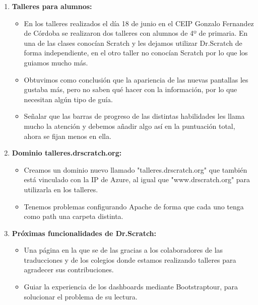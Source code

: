 \documentclass[a4paper,12pt]{letter}
\begin{document}
\begin{letter}
\begin{enumerate}
    
    \item{\textbf {Talleres para alumnos:}}
    \begin{itemize}
            \item {En los talleres realizados el día 18 de junio en el CEIP
                    Gonzalo Fernandez de Córdoba se realizaron dos talleres con
                    alumnos de 4º de primaria. En una de las clases conocían 
                    Scratch y les dejamos utilizar Dr.Scratch de forma independiente,
                    en el otro taller no conocían Scratch por lo que los guiamos
                    mucho más.}
            \item {Obtuvimos como conclusión que la apariencia de las nuevas
                    pantallas les gustaba más, pero no saben qué hacer
                    con la información, por lo que necesitan algún tipo de guía.}
            \item {Señalar que las barras de progreso de las distintas habilidades
                    les llama mucho la atención y debemos añadir algo así en la
                    puntuación total, ahora se fijan menos en ella.}
    \end{itemize}
    
    \item{\textbf {Dominio talleres.drscratch.org:}}
    \begin{itemize}
            \item {Creamos un dominio nuevo llamado "talleres.drscratch.org" que
                    también está vinculado con la IP de Azure, al igual que 
                    "www.drscratch.org" para utilizarla en los talleres.}
            \item {Tenemos problemas configurando Apache de forma que cada uno
                    tenga como path una carpeta distinta.}
    \end{itemize}

    \item{\textbf {Próximas funcionalidades de Dr.Scratch:}}
    \begin{itemize}
        \item {Una página en la que se de las gracias a los colaboradores de 
                las traducciones y de los colegios donde estamos realizando talleres
                para agradecer sus contribuciones.}
        \item {Guiar la experiencia de los dashboards mediante Bootstraptour, 
                para solucionar el problema de su lectura.}
    \end{itemize}


\end{enumerate}

\end{letter}
\end{document}
